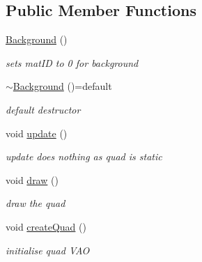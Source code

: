 \subsection*{Public Member Functions}
\begin{DoxyCompactItemize}
\item 
\hypertarget{class_background_a05b686e4ce0cbdb3b1fa14a93fdf98a1}{\hyperlink{class_background_a05b686e4ce0cbdb3b1fa14a93fdf98a1}{Background} ()}\label{class_background_a05b686e4ce0cbdb3b1fa14a93fdf98a1}

\begin{DoxyCompactList}\small\item\em sets mat\-I\-D to 0 for background \end{DoxyCompactList}\item 
\hypertarget{class_background_a688dc1ad4d16b9bc79966f7f71d40bb8}{\hyperlink{class_background_a688dc1ad4d16b9bc79966f7f71d40bb8}{$\sim$\-Background} ()=default}\label{class_background_a688dc1ad4d16b9bc79966f7f71d40bb8}

\begin{DoxyCompactList}\small\item\em default destructor \end{DoxyCompactList}\item 
\hypertarget{class_background_acab58b65d4299d4bd51b8376e8c3e3d3}{void \hyperlink{class_background_acab58b65d4299d4bd51b8376e8c3e3d3}{update} ()}\label{class_background_acab58b65d4299d4bd51b8376e8c3e3d3}

\begin{DoxyCompactList}\small\item\em update does nothing as quad is static \end{DoxyCompactList}\item 
\hypertarget{class_background_a448f05ff40a9d17be87c568294c63aaf}{void \hyperlink{class_background_a448f05ff40a9d17be87c568294c63aaf}{draw} ()}\label{class_background_a448f05ff40a9d17be87c568294c63aaf}

\begin{DoxyCompactList}\small\item\em draw the quad \end{DoxyCompactList}\item 
\hypertarget{class_background_ae07a9ea8891fdab015642386f77132c3}{void \hyperlink{class_background_ae07a9ea8891fdab015642386f77132c3}{create\-Quad} ()}\label{class_background_ae07a9ea8891fdab015642386f77132c3}

\begin{DoxyCompactList}\small\item\em initialise quad V\-A\-O \end{DoxyCompactList}\end{DoxyCompactItemize}
